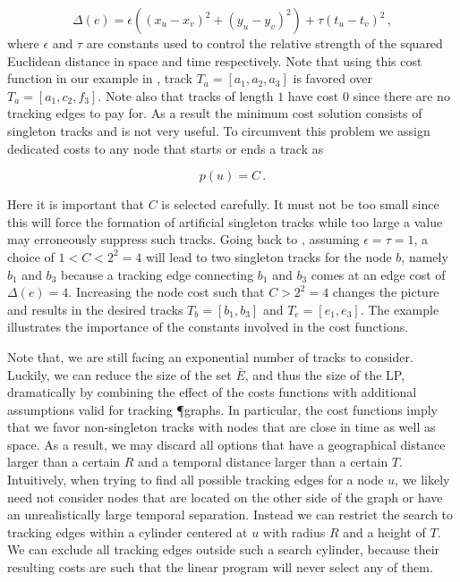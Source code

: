 		\begin{equation}
		\Delta(e) = \epsilon ((x_u - x_v)^2 + (y_u - y_v)^2 ) + \tau (t_u - t_v)^2\,,
		\end{equation}
		where $\epsilon$ and $\tau$ are constants used to control the relative strength of the squared Euclidean distance in space and time respectively. Note that using this cost function in our example in , track $T_a = [a_1,a_2,a_3]$ is favored over $T_a = [a_1,c_2,f_3]$. Note also that tracks of length $1$ have cost $0$ since there are no tracking edges to pay for. As a result the minimum cost solution consists of singleton tracks and is not very useful. To circumvent this problem we assign dedicated costs to any node that starts or ends a track as

		\begin{equation}
		p(u) = C\,.
		\end{equation}

		Here it is important that $C$ is selected carefully. It must not be too small since this will force the formation of artificial singleton tracks while too large a value may erroneously suppress such tracks. Going back to , assuming $\epsilon = \tau = 1$, a choice of $ 1 < C < 2^2 = 4$ will lead to two singleton tracks for the node $b$, namely ${b_1}$ and ${b_3}$ because a tracking edge connecting $b_1$ and $b_3$ comes at an edge cost of $\Delta(e)=4$. Increasing the node cost such that $C>2^2 = 4$ changes the picture and results in the desired tracks $T_b = [b_1, b_3]$ and $T_e = [e_1, e_3]$. The example illustrates the importance of the constants involved in the cost functions.

		Note that, we are still facing an exponential number of tracks to consider. Luckily, we can reduce the size of the set $\bar{E}$, and thus the size of the LP, dramatically by combining the effect of the costs functions with additional assumptions valid for tracking \P graphs. In particular, the cost functions imply that we favor non-singleton tracks with nodes that are close in time as well as space. As a result, we may discard all options that have a geographical distance larger than a certain $R$ and a temporal distance larger than a certain $T$. Intuitively, when trying to find all possible tracking edges for a node $u$, we likely need not consider nodes that are located on the other side of the graph or have an unrealistically large temporal separation. Instead we can restrict the search to tracking edges within a cylinder centered at $u$ with radius $R$ and a height of $T$. We can exclude all tracking edges outside such a search cylinder, because their resulting costs are such that the linear program will never select any of them. 

